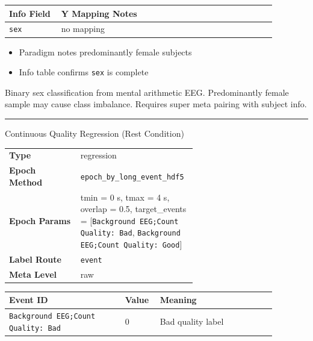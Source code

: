 {\begin{tcolorbox}
\begingroup\footnotesize
\begin{tabular}{@{}p{0.1760\linewidth}p{0.7040\linewidth}@{}}
\toprule
\textbf{Info Field} & \textbf{Y Mapping Notes} \\
\midrule
\texttt{sex} & no mapping \\
\bottomrule
\end{tabular}
\endgroup
\par{}\par
\begin{itemize}[leftmargin=1.3em,noitemsep,topsep=1pt]
\item[\scriptsize$\cdot$] {\scriptsize Paradigm notes predominantly female subjects}
\item[\scriptsize$\cdot$] {\scriptsize Info table confirms \texttt{sex} is complete}
\end{itemize}
\par{} {\footnotesize Binary sex classification from mental arithmetic EEG. Predominantly female sample may cause class imbalance. Requires super meta pairing with subject info.}
\noindent\rule{\linewidth}{0.4pt}\par\nopagebreak
{} {\footnotesize Continuous Quality Regression (Rest Condition)}\par\smallskip
{\footnotesize\begin{tabular}{@{}lp{0.62\linewidth}@{}}
\textbf{Type} & regression \\
\textbf{Epoch Method} & \texttt{epoch\_by\_long\_event\_hdf5} \\
\textbf{Epoch Params} & tmin = 0 s, tmax = 4 s, overlap = 0.5, target\_events = [\texttt{Background EEG;Count Quality: Bad}, \texttt{Background EEG;Count Quality: Good}] \\
\textbf{Label Route} & \texttt{event} \\
\textbf{Meta Level} & raw \\
\end{tabular}}
\par{}\par\smallskip
\begingroup\footnotesize
\begin{tabular}{@{}p{0.3911\linewidth}p{0.0978\linewidth}p{0.3911\linewidth}@{}}
\toprule
\textbf{Event ID} & \textbf{Value} & \textbf{Meaning} \\
\midrule
\texttt{Background EEG;Count Quality: Bad} & 0 & Bad quality label \\

\end{tabular}
\end{tcolorbox}}
